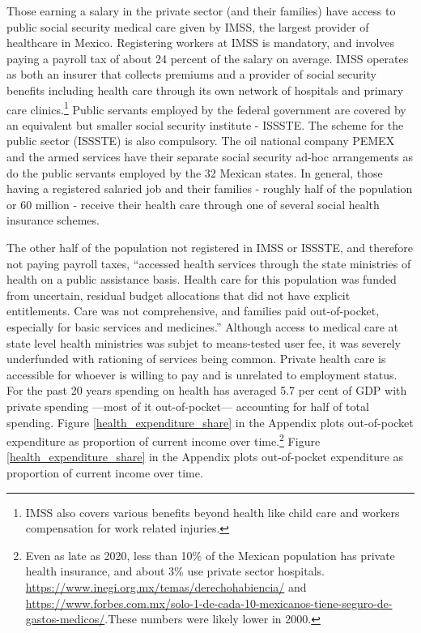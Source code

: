 \documentclass[oneside,11pt]{article}
\begin{document}
Those earning a salary in the private sector (and their families) have access to public social security medical care given by IMSS, the largest provider of healthcare in Mexico. Registering workers at IMSS is mandatory, and involves paying a payroll tax of about 24 percent of the salary on average. IMSS operates as both an insurer that collects premiums and a provider of social security benefits including health care through its own network of hospitals and primary care clinics.\footnote{IMSS also covers various benefits beyond health like child care and workers compensation for work related injuries.}  Public servants employed by the federal government are covered by an equivalent but smaller social security institute - ISSSTE. The scheme for the public sector (ISSSTE) is also compulsory. The oil national company PEMEX and the armed services have their separate social security ad-hoc arrangements as do the public servants employed by the 32 Mexican states. In general, those having a registered salaried job and their families - roughly half of the population or 60 million - receive their health care through one of several social health insurance schemes.

The other half of the population not registered in IMSS or ISSSTE, and therefore not paying payroll taxes, ``accessed health services through the state ministries of health on a public assistance basis. Health care for this population was funded from uncertain, residual budget allocations that did not have explicit entitlements. Care was not comprehensive, and families paid out-of-pocket, especially for basic services and medicines.'' \citep{Lancet} Although access to medical care at state level health ministries was subjet to means-tested user fee, it was severely underfunded with rationing of services being common. Private health care is accessible for whoever is willing to pay and is unrelated to employment status.  For the past 20 years spending on health has averaged 5.7 per cent of GDP with private spending ---most of it out-of-pocket--- accounting for half of total spending. Figure \ref{health_expenditure_share} in the Appendix plots out-of-pocket expenditure as proportion of current income over time.\footnote{Even as late as 2020, less than 10\% of the Mexican population has private health insurance, and about 3\% use private sector hospitals. \url{https://www.inegi.org.mx/temas/derechohabiencia/} and \url{https://www.forbes.com.mx/solo-1-de-cada-10-mexicanos-tiene-seguro-de-gastos-medicos/}.These numbers were likely lower in 2000.} Figure \ref{health_expenditure_share} in the Appendix plots out-of-pocket expenditure as proportion of current income over time.
 
\end{document}
